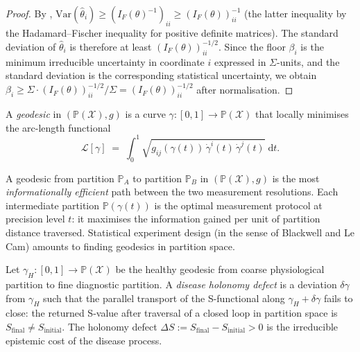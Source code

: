 \begin{proof}
By , $\mathrm{Var}(\hat{\theta}_i) \geq
(I_F(\theta)^{-1})_{ii} \geq (I_F(\theta))_{ii}^{-1}$ (the latter inequality
by the Hadamard--Fischer inequality for positive definite matrices).  The
standard deviation of $\hat\theta_i$ is therefore at least
$(I_F(\theta))_{ii}^{-1/2}$.  Since the floor $\beta_i$ is the minimum
irreducible uncertainty in coordinate $i$ expressed in $\Sigma$-units, and
the standard deviation is the corresponding statistical uncertainty, we obtain
$\beta_i \geq \Sigma \cdot (I_F(\theta))_{ii}^{-1/2} / \Sigma =
(I_F(\theta))_{ii}^{-1/2}$ after normalisation.
\end{proof}

\begin{definition}
\label{def:ch02-geodesics}
A \emph{geodesic} in $(\mathbb{P}(\mathcal{X}), g)$ is a curve
$\gamma: [0,1] \to \mathbb{P}(\mathcal{X})$ that locally minimises the
arc-length functional
\[
  \mathcal{L}[\gamma]
  \;=\;
  \int_0^1 \sqrt{g_{ij}(\gamma(t))\,\dot\gamma^i(t)\,\dot\gamma^j(t)}\;\mathrm{d}t.
\]
\end{definition}

\begin{remark}
\label{rem:ch02-geodesics-optimal}
A geodesic from partition $\mathbb{P}_A$ to partition $\mathbb{P}_B$ in
$(\mathbb{P}(\mathcal{X}), g)$ is the most \emph{informationally efficient}
path between the two measurement resolutions.  Each intermediate partition
$\mathbb{P}(\gamma(t))$ is the optimal measurement protocol at precision level
$t$: it maximises the information gained per unit of partition distance
traversed.  Statistical experiment design (in the sense of Blackwell and Le
Cam) amounts to finding geodesics in partition space.
\end{remark}

\begin{definition}
\label{def:ch02-disease-geodesic}
Let $\gamma_H: [0,1] \to \mathbb{P}(\mathcal{X})$ be the healthy geodesic
from coarse physiological partition to fine diagnostic partition.  A
\emph{disease holonomy defect} is a deviation $\delta\gamma$ from $\gamma_H$
such that the parallel transport of the S-functional along $\gamma_H +
\delta\gamma$ fails to close: the returned S-value after traversal of a
closed loop in partition space is $S_{\mathrm{final}} \neq S_{\mathrm{initial}}$.
The holonomy defect $\Delta S := S_{\mathrm{final}} - S_{\mathrm{initial}} > 0$
is the irreducible epistemic cost of the disease process.
\end{definition}

